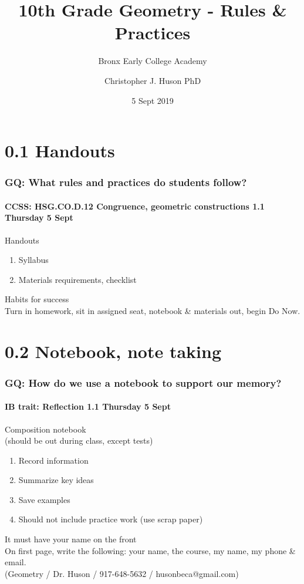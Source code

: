 \documentclass{beamer}
\title{10th Grade Geometry - Rules \& Practices}
\subtitle{Bronx Early College Academy}
\author{Christopher J. Huson PhD}
\date{5 Sept 2019}
\begin{document}
\frame{\titlepage}
\section[Outline]{}
\frame{\tableofcontents}


\section{0.1 Handouts}
  \frame
  {
    \frametitle{GQ: What rules and practices do students follow?}
    \framesubtitle{CCSS: HSG.CO.D.12 Congruence, geometric constructions \hfill \alert{1.1 Thursday 5 Sept}}

    \begin{block}{Handouts}
      \begin{enumerate}
        \item Syllabus
        \item Materials requirements, checklist
      \end{enumerate}
    \end{block}
    Habits for success\\[0.25cm]
    Turn in homework, sit in assigned seat, notebook \& materials out, begin Do Now.
  }

\section{0.2 Notebook, note taking}
  \frame
  {
    \frametitle{GQ: How do we use a notebook to support our memory?}
    \framesubtitle{IB trait: Reflection \hfill \alert{1.1 Thursday 5 Sept}}

    \begin{block}{Composition notebook \\(should be out during class, except tests)}
      \begin{enumerate}
        \item Record information
        \item Summarize key ideas
        \item Save examples
        \item Should not include practice work (use scrap paper)
      \end{enumerate}
    \end{block}
    It must have your name on the front\\[0.25cm]
    On first page, write the following: your name, the course, my name, my phone \& email. \\(Geometry / Dr. Huson / 917-648-5632 / husonbeca@gmail.com)
  }
\end{document}
